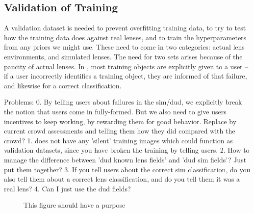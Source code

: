 \documentclass[useAMS,usenatbib,a4paper]{mn2e}
\begin{document}
\subsection{Validation of Training}
\label{sec:validation}


A validation dataset is needed to prevent overfitting training data, to try
to test how the training data does against real lenses, and to train the
hyperparameters from any priors we might use. These need to come in
two categories: actual lens environments, and simulated lenses. The need for
two sets arises because of the paucity of actual lenses. In \SW, most training
objects are explicitly given to a user -- if a user incorrectly identifies a
training object, they are informed of that failure, and likewise for a correct
classification.

Problems:
0. By telling users about failures in the sim/dud, we explicitly break the
notion that users come in fully-formed. But we also need to give users
incentives to keep working, by rewarding them for good behavior. Replace by
current crowd assessments and telling them how they did compared with the
crowd?
1. \SW does not have any 'silent' training images which could function as
validation datasets, since you have broken the training by telling users.
2. How to manage the difference between 'dud known lens fields' and 'dud sim
fields'? Just put them together?
3. If you tell users about the correct sim classification, do you also tell
them about a correct lens classification, and do you tell them it was a real
lens?
4. Can I just use the dud fields?

\begin{figure}
\begin{center}
\end{center}
\caption{This figure should have a purpose}
\label{fig:validation}
\end{figure}


\end{document}
